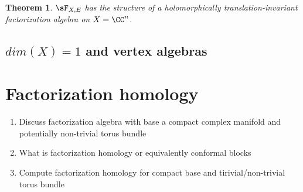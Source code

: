 \documentclass[12pt]{amsart}
\newtheorem{theorem}{Theorem}[section]
\theoremstyle{definition}
\theoremstyle{remark}
\def\brian{\textcolor{blue}{BW: }\textcolor{blue}}
\begin{document}
\begin{theorem}
$\sF_{X,E}$ has the structure of a holomorphically translation-invariant factorization algebra on $X=\CC^n$. 
\end{theorem}

\subsection{$dim(X)=1$ and vertex algebras}

\section{Factorization homology}

{\color{red}
\begin{enumerate}
\item Discuss factorization algebra with base a compact complex manifold and potentially non-trivial torus bundle
\item What is factorization homology or equivalently conformal blocks
\item Compute factorization homology for compact base and tirivial/non-trivial torus bundle
\end{enumerate}
}

\newpage


%  




\address{\tiny DEPARTMENT OF MATHEMATICS AND STATISTICS, BOSTON UNIVERSITY, 111 CUMMINGTON MALL, BOSTON} \\
\indent \footnotesize{}

\address{\tiny DEPARTMENT OF MATHEMATICS, NORTH\brian{WESTERN/EASTERN},...}
\indent \footnotesize{}
\end{document}
